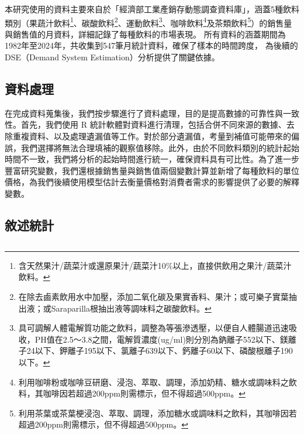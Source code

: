 本研究使用的資料主要來自於「經濟部工業產銷存動態調查資料庫」\citep{moea_statistics}，涵蓋5種飲料類別（果蔬汁飲料\footnote{含天然果汁/蔬菜汁或還原果汁/蔬菜汁10\%以上，直接供飲用之果汁/蔬菜汁飲料。
}、碳酸飲料\footnote{在除去鹵素飲用水中加壓，添加二氧化碳及果實香料、果汁；或可樂子實葉抽出液；或Saraparilla根抽出液等調味料之碳酸飲料。
}、運動飲料\footnote{具可調解人體電解質功能之飲料，調整為等張滲透壓，以便自人體腸道迅速吸收，PH值在2.5～3.8之間，電解質濃度(ug/ml)則分別為鈉離子552以下、鎂離子24以下、鉀離子195以下、氯離子639以下、鈣離子60以下、磷酸根離子190以下。
}、咖啡飲料\footnote{利用咖啡粉或咖啡豆研磨、浸泡、萃取、調理，添加奶精、糖水或調味料之飲料，其咖啡因若超過200ppm則需標示，但不得超過500ppm。
}及茶類飲料\footnote{利用茶葉或茶葉梗浸泡、萃取、調理，添加糖水或調味料之飲料，其咖啡因若超過200ppm則需標示，但不得超過500ppm。
}）的銷售量與銷售值的月資料，詳細記錄了每種飲料的市場表現。
所有資料的涵蓋期間為1982年至2024年，共收集到547筆月統計資料，確保了樣本的時間跨度，
為後續的DSE（Demand System Estimation）分析提供了關鍵依據。

\subsection{資料處理}

在完成資料蒐集後，我們按步驟進行了資料處理，目的是提高數據的可靠性與一致性。首先，我們使用 R 統計軟體對資料進行清理，包括合併不同來源的數據、去除重複資料、以及處理遺漏值等工作。對於部分遺漏值，考量到補值可能帶來的偏誤，我們選擇將無法合理填補的觀察值移除。此外，由於不同飲料類別的統計起始時間不一致，我們將分析的起始時間進行統一，確保資料具有可比性。為了進一步豐富研究變數，我們還根據銷售量與銷售值兩個變數計算並新增了每種飲料的單位價格，為我們後續使用模型估計去衡量價格對消費者需求的影響提供了必要的解釋變數。

\subsection{敘述統計}


\subsection{}